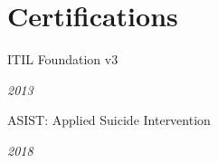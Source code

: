 \section{Certifications} %
\small{%

\parbox[t][][t]{\linewidth}{
	\parbox{\linewidth}{ITIL Foundation v3}}
	\smallbreak
	\parbox{\linewidth}{{\textit{2013}}}
	\bigbreak
}

\parbox[t][][t]{\linewidth}{
	\parbox{\linewidth}{ASIST: Applied Suicide Intervention}
	\smallbreak
	\parbox{\linewidth}{{\textit{2018}}}
	\bigbreak
}


